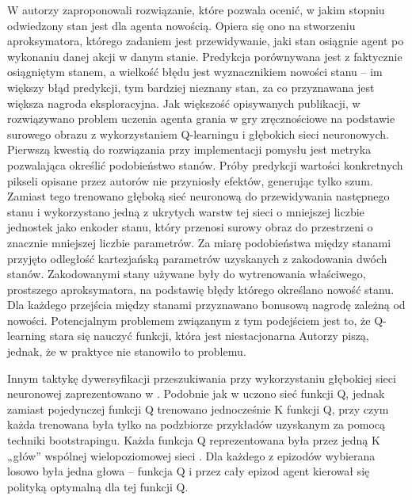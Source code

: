 W \cite{DBLP:journals/corr/StadieLA15} autorzy zaproponowali rozwiązanie, które pozwala ocenić, w jakim stopniu odwiedzony stan jest dla agenta nowością. Opiera się ono na stworzeniu aproksymatora, którego zadaniem jest przewidywanie, jaki stan osiągnie agent po wykonaniu danej akcji w danym stanie. Predykcja porównywana jest z faktycznie osiągniętym stanem, a wielkość błędu jest wyznacznikiem nowości stanu – im większy błąd predykcji, tym bardziej nieznany stan, za co przyznawana jest większa nagroda eksploracyjna. Jak większość opisywanych publikacji, w \cite{DBLP:journals/corr/StadieLA15} rozwiązywano problem uczenia agenta grania w gry zręcznościowe na podstawie surowego obrazu z wykorzystaniem Q-learningu i głębokich sieci neuronowych. Pierwszą kwestią do rozwiązania przy implementacji pomysłu jest metryka pozwalająca określić podobieństwo stanów. Próby predykcji wartości konkretnych pikseli opisane przez autorów nie przyniosły efektów, generując tylko szum. Zamiast tego trenowano głęboką sieć neuronową do przewidywania następnego stanu i wykorzystano jedną z ukrytych warstw tej sieci o mniejszej liczbie jednostek jako enkoder stanu, który przenosi surowy obraz do przestrzeni o znacznie mniejszej liczbie parametrów. Za miarę podobieństwa między stanami przyjęto odległość kartezjańską parametrów uzyskanych z zakodowania dwóch stanów. Zakodowanymi stany używane były do wytrenowania właściwego, prostszego aproksymatora, na podstawię błędy którego określano nowość stanu. Dla każdego przejścia między stanami przyznawano bonusową nagrodę zależną od nowości. Potencjalnym problemem związanym z tym podejściem jest to, że Q-learning stara się nauczyć funkcji, która jest niestacjonarna Autorzy piszą, jednak, że w praktyce nie stanowiło to problemu.

Innym taktykę dywersyfikacji przeszukiwania przy wykorzystaniu głębokiej sieci neuronowej zaprezentowano w \cite{DBLP:journals/corr/OsbandBPR16}. Podobnie jak w \cite{DBLP:journals/corr/StadieLA15} uczono sieć funkcji Q, jednak zamiast pojedynczej funkcji Q trenowano jednocześnie K funkcji Q, przy czym każda trenowana była tylko na podzbiorze przykładów uzyskanym za pomocą techniki bootstrapingu. Każda funkcja Q reprezentowana była przez jedną K „głów” wspólnej wielopoziomowej sieci . Dla każdego z epizodów wybierana losowo była jedna głowa – funkcja Q i przez cały epizod agent kierował się polityką optymalną dla tej funkcji Q.
